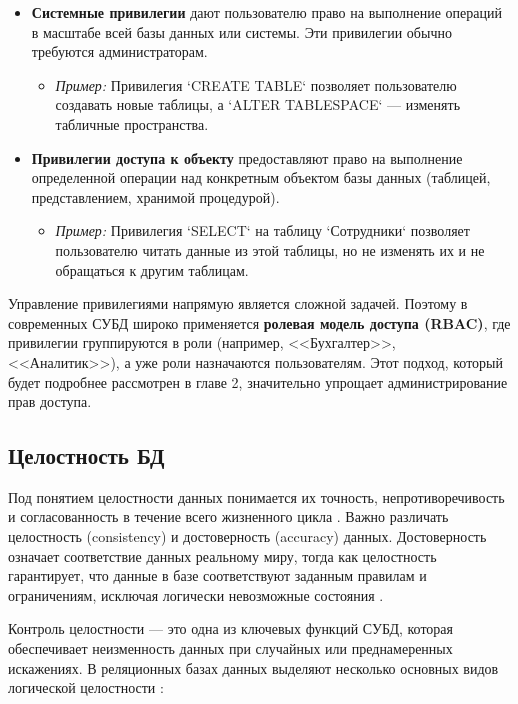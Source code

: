 \begin{itemize}
    \item \textbf{Системные привилегии} дают пользователю право на выполнение операций в масштабе всей базы данных или системы. Эти привилегии обычно требуются администраторам.
    \begin{itemize}
        \item \textit{Пример:} Привилегия `CREATE TABLE` позволяет пользователю создавать новые таблицы, а `ALTER TABLESPACE` — изменять табличные пространства.
    \end{itemize}

    \item \textbf{Привилегии доступа к объекту} предоставляют право на выполнение определенной операции над конкретным объектом базы данных (таблицей, представлением, хранимой процедурой).
    \begin{itemize}
        \item \textit{Пример:} Привилегия `SELECT` на таблицу `Сотрудники` позволяет пользователю читать данные из этой таблицы, но не изменять их и не обращаться к другим таблицам.
    \end{itemize}
\end{itemize}

Управление привилегиями напрямую является сложной задачей. Поэтому в современных СУБД широко применяется \textbf{ролевая модель доступа (RBAC)}, где привилегии группируются в роли (например, <<Бухгалтер>>, <<Аналитик>>), а уже роли назначаются пользователям. Этот подход, который будет подробнее рассмотрен в главе 2, значительно упрощает администрирование прав доступа.

\subsection{Целостность БД}
Под понятием целостности данных понимается их точность, непротиворечивость и согласованность в течение всего жизненного цикла \autocite[с. 18]{Skakun}. Важно различать целостность (consistency) и достоверность (accuracy) данных. Достоверность означает соответствие данных реальному миру, тогда как целостность гарантирует, что данные в базе соответствуют заданным правилам и ограничениям, исключая логически невозможные состояния \autocite{ElmasriNavathe}.

Контроль целостности — это одна из ключевых функций СУБД, которая обеспечивает неизменность данных при случайных или преднамеренных искажениях. В реляционных базах данных выделяют несколько основных видов логической целостности \autocite{Silberschatz}:

